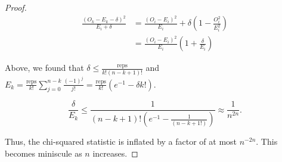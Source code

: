 \documentclass[12pt]{article}
\begin{document}
\begin{proof}
\begin{align*}
\frac{(O_k-E_k-\delta)^2}{E_i+\delta} &= \frac{(O_i-E_i)^2}{E_i} + \delta\left( 1- \frac{O_i^2}{E_i^2}\right) \\
&= \frac{(O_i-E_i)^2}{E_i}\left( 1 + \frac{\delta}{E_i} \right) 
\end{align*}

Above, we found that $\delta \leq \frac{\text{reps}}{k!(n-k+1)!}$ and $E_k = \frac{\text{reps}}{k!}\sum_{j=0}^{n-k}\frac{(-1)^j}{j!} = \frac{\text{reps}}{k!} \left(e^{-1} - \delta k!\right)$.

$$ \frac{\delta}{E_k} \leq \frac{1}{(n-k+1)! (e^{-1} - \frac{1}{(n-k+1!)})} \approx \frac{1}{n^{2n}}.$$

Thus, the chi-squared statistic is inflated by a factor of at most $n^{-2n}$.
This becomes miniscule as $n$ increases.

\end{proof}
\end{document}
